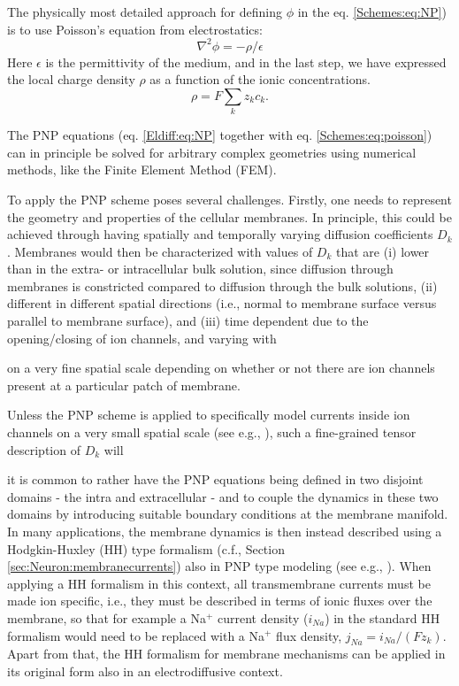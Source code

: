 \subsubsection{}
\label{sec:Schemes:PNP}
The physically most detailed approach for defining $\phi$ in the eq. \ref{Schemes:eq:NP}) is to use Poisson's equation from electrostatics:
\begin{equation}
\nabla^2 \phi = -\rho/\epsilon
\label{Schemes:eq:poisson}
\end{equation}
Here $\epsilon$ is the permittivity of the medium, and in the last step, we have expressed the local charge density $\rho$ as a function of the ionic concentrations. 
\begin{equation}
\rho = F\sum_k z_k c_k.
\label{Schemes:eq:PNPrho}
\end{equation}

The PNP equations (eq. \ref{Eldiff:eq:NP} together with eq. \ref{Schemes:eq:poisson}) can in principle be solved for arbitrary complex geometries using numerical methods, like the Finite Element Method (FEM). 

To apply the PNP scheme poses several challenges. Firstly, one needs to represent the geometry and properties of the cellular membranes. In principle, this could be achieved through having spatially and temporally varying diffusion coefficients $D_k$. Membranes would then be characterized with values of $D_k$ that are (i) lower than in the extra- or intracellular bulk solution, since diffusion through membranes is constricted compared to diffusion through the bulk solutions, (ii) different in different spatial directions (i.e., normal to membrane surface versus parallel to membrane surface), and (iii) time dependent due to the opening/closing of ion channels, and varying with 

on a very fine spatial scale depending on whether or not there are ion channels present at a particular patch of membrane. 

Unless the PNP scheme is applied to specifically model currents inside ion channels on a very small spatial scale (see e.g., \citep{Gardner2011, Zheng2011}), such a fine-grained tensor description of $D_k$ will 

it is common to rather have the PNP equations being defined in two disjoint domains - the intra and extracellular - and to couple the dynamics in these two domains by introducing suitable boundary conditions at the membrane manifold. In many applications, the membrane dynamics is then instead described using a Hodgkin-Huxley (HH) type formalism (c.f., Section \ref{sec:Neuron:membranecurrents}) also in PNP type modeling (see e.g., \citep{Lopreore2008, Pods2013, Gardner2015, Pods2017}). When applying a HH formalism in this context, all transmembrane currents must be made ion specific, i.e., they must be described in terms of ionic fluxes over the membrane, so that for example a Na$^+$ current density ($i_{Na}$) in the standard HH formalism would need to be replaced with a Na$^+$ flux density, $j_{Na} = i_{Na}/(Fz_k)$. Apart from that, the HH formalism for membrane mechanisms can be applied in its original form also in an electrodiffusive context.

